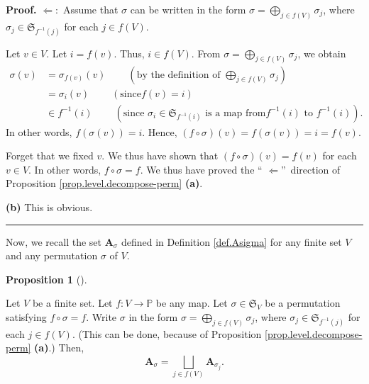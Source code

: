 \documentclass[numbers=enddot,12pt,final,onecolumn,notitlepage]{scrartcl}%
\numberwithin{exer}{section}
\theoremstyle{definition}
\newtheorem{prop}[theo]{Proposition}
\newenvironment{proposition}[1][]
{\begin{prop}[#1]\begin{leftbar}}
{\end{leftbar}\end{prop}}
\newenvironment{proof}[1][Proof]{\noindent\textbf{#1.} }{\ \rule{0.5em}{0.5em}}
\let\sqcupnonlimits\bigsqcup
\let\oplusnonlimits\bigoplus
\renewcommand{\bigsqcup}{\sqcupnonlimits\limits}
\renewcommand{\bigoplus}{\oplusnonlimits\limits}
\newenvironment{verlong}{}{}
\begin{document}
\begin{verlong}
\begin{proof}
$\Longleftarrow:$ Assume that $\sigma$ can be written in the form
$\sigma=\bigoplus_{j\in f\left(  V\right)  }\sigma_{j}$, where $\sigma_{j}%
\in\mathfrak{S}_{f^{-1}\left(  j\right)  }$ for each $j\in f\left(  V\right)
$.

Let $v\in V$. Let $i=f\left(  v\right)  $. Thus, $i\in f\left(  V\right)  $.
From $\sigma=\bigoplus_{j\in f\left(  V\right)  }\sigma_{j}$, we obtain
\begin{align*}
\sigma\left(  v\right)   &  =\sigma_{f\left(  v\right)  }\left(  v\right)
\ \ \ \ \ \ \ \ \ \ \left(  \text{by the definition of }\bigoplus_{j\in
f\left(  V\right)  }\sigma_{j}\right) \\
&  =\sigma_{i}\left(  v\right)  \ \ \ \ \ \ \ \ \ \ \left(  \text{since
}f\left(  v\right)  =i\right) \\
&  \in f^{-1}\left(  i\right)  \ \ \ \ \ \ \ \ \ \ \left(  \text{since }%
\sigma_{i}\in\mathfrak{S}_{f^{-1}\left(  i\right)  }\text{ is a map from
}f^{-1}\left(  i\right)  \text{ to }f^{-1}\left(  i\right)  \right)  .
\end{align*}
In other words, $f\left(  \sigma\left(  v\right)  \right)  =i$. Hence,
$\left(  f\circ\sigma\right)  \left(  v\right)  =f\left(  \sigma\left(
v\right)  \right)  =i=f\left(  v\right)  $.

Forget that we fixed $v$. We thus have shown that $\left(  f\circ
\sigma\right)  \left(  v\right)  =f\left(  v\right)  $ for each $v\in V$. In
other words, $f\circ\sigma=f$. We thus have proved the \textquotedblleft%
$\Longleftarrow$\textquotedblright\ direction of Proposition
\ref{prop.level.decompose-perm} \textbf{(a)}.

\textbf{(b)} This is obvious.
\end{proof}
\end{verlong}

Now, we recall the set $\mathbf{A}_{\sigma}$ defined in Definition
\ref{def.Asigma} for any finite set $V$ and any permutation $\sigma$ of $V$.

\begin{proposition}
\label{prop.level.Asig-f2}Let $V$ be a finite set. Let $f:V\rightarrow
\mathbb{P}$ be any map. Let $\sigma\in\mathfrak{S}_{V}$ be a permutation
satisfying $f\circ\sigma=f$. Write $\sigma$ in the form $\sigma=\bigoplus
_{j\in f\left(  V\right)  }\sigma_{j}$, where $\sigma_{j}\in\mathfrak{S}%
_{f^{-1}\left(  j\right)  }$ for each $j\in f\left(  V\right)  $. (This can be
done, because of Proposition \ref{prop.level.decompose-perm} \textbf{(a)}.)
Then,
\[
\mathbf{A}_{\sigma}=\bigsqcup_{j\in f\left(  V\right)  }\mathbf{A}_{\sigma
_{j}}.
\]

\end{proposition}
\end{document}
